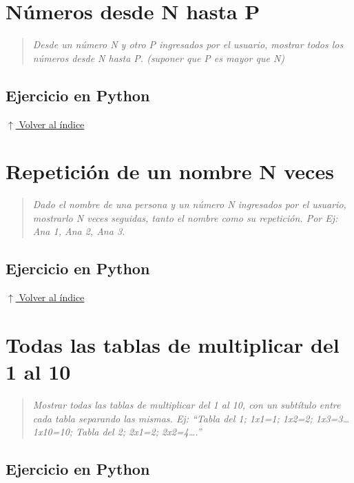 \documentclass[12pt]{article}
\newcommand{\codigopython}[2]{%
}
\newcommand{\volverindice}{%
    \vspace{1em}%
    \begin{flushright}%
        \hyperlink{indice}{\small $\uparrow$ Volver al índice}%
    \end{flushright}%
}
\newcommand{\enunciado}[1]{%
    \begin{quote}
        \itshape #1
    \end{quote}
}
\begin{document}
\section{Números desde N hasta P}

\enunciado{Desde un número N y otro P ingresados por el usuario, mostrar todos los números desde N hasta P. (suponer que P es mayor que N)}

\subsection*{Ejercicio en Python}

\codigopython{19}{Números desde N hasta P}

\volverindice
\newpage


\section{Repetición de un nombre N veces}

\enunciado{Dado el nombre de una persona y un número N ingresados por el usuario, mostrarlo N veces seguidas, tanto el nombre como su repetición. Por Ej: Ana 1, Ana 2, Ana 3.}

\subsection*{Ejercicio en Python}

\codigopython{20}{Repetición de un nombre N veces}

\volverindice
\newpage


\section{Todas las tablas de multiplicar del 1 al 10}

\enunciado{Mostrar todas las tablas de multiplicar del 1 al 10, con un subtítulo entre cada tabla separando las mismas. Ej: \enquote{Tabla del 1; 1x1=1; 1x2=2; 1x3=3…1x10=10; Tabla del 2; 2x1=2; 2x2=4….}}

\subsection*{Ejercicio en Python}

\codigopython{21}{Todas las tablas de multiplicar del 1 al 10}
\end{document}
